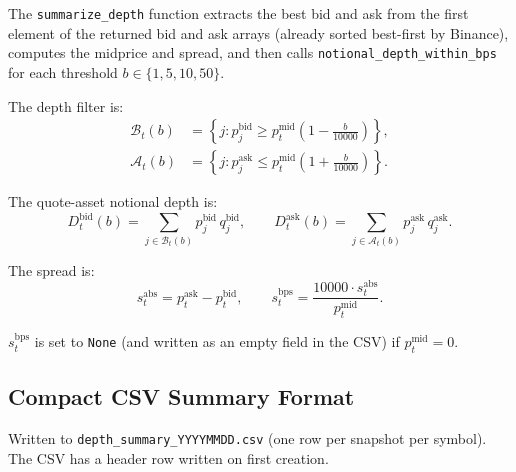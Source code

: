 \documentclass[11pt,a4paper]{article}
\begin{document}
The \texttt{summarize\_depth} function extracts the best bid and ask
from the first element of the returned bid and ask arrays (already
sorted best-first by Binance), computes the midprice and spread, and
then calls \texttt{notional\_depth\_within\_bps} for each threshold
$b \in \{1, 5, 10, 50\}$.

The depth filter is:
\begin{align*}
  \mathcal{B}_t(b) &= \left\{ j : p_j^{\mathrm{bid}} \geq
    p_t^{\mathrm{mid}}\!\left(1 - \tfrac{b}{10000}\right) \right\}, \\
  \mathcal{A}_t(b) &= \left\{ j : p_j^{\mathrm{ask}} \leq
    p_t^{\mathrm{mid}}\!\left(1 + \tfrac{b}{10000}\right) \right\}.
\end{align*}

The quote-asset notional depth is:
\[
  D_t^{\mathrm{bid}}(b) =
    \sum_{j \in \mathcal{B}_t(b)} p_j^{\mathrm{bid}}\, q_j^{\mathrm{bid}},
  \qquad
  D_t^{\mathrm{ask}}(b) =
    \sum_{j \in \mathcal{A}_t(b)} p_j^{\mathrm{ask}}\, q_j^{\mathrm{ask}}.
\]

The spread is:
\[
  s_t^{\mathrm{abs}} = p_t^{\mathrm{ask}} - p_t^{\mathrm{bid}},
  \qquad
  s_t^{\mathrm{bps}} = \frac{10000 \cdot s_t^{\mathrm{abs}}}
    {p_t^{\mathrm{mid}}}.
\]

$s_t^{\mathrm{bps}}$ is set to \texttt{None} (and written as an empty
field in the CSV) if $p_t^{\mathrm{mid}} = 0$.

\subsection{Compact CSV Summary Format}

Written to \texttt{depth\_summary\_YYYYMMDD.csv} (one row per
snapshot per symbol). The CSV has a header row written on first
creation.
\end{document}

